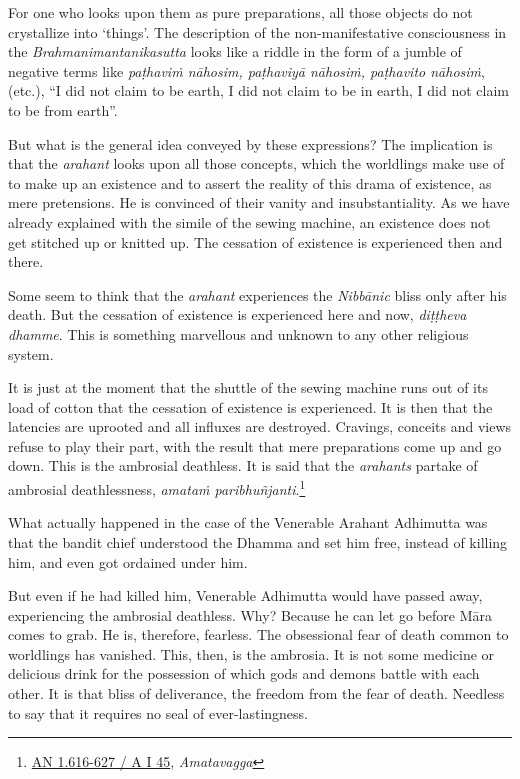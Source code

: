 For one who looks upon them as pure preparations, all those objects do not crystallize into `things'. The description of the non-manifestative consciousness in the \emph{Brahmanimantanikasutta} looks like a riddle in the form of a jumble of negative terms like \emph{paṭhaviṁ nāhosim, paṭhaviyā nāhosiṁ, paṭhavito nāhosiṁ}, (etc.), ``I did not claim to be earth, I did not claim to be in earth, I did not claim to be from earth''.

But what is the general idea conveyed by these expressions? The implication is that the \emph{arahant} looks upon all those concepts, which the worldlings make use of to make up an existence and to assert the reality of this drama of existence, as mere pretensions. He is convinced of their vanity and insubstantiality. As we have already explained with the simile of the sewing machine, an existence does not get stitched up or knitted up. The cessation of existence is experienced then and there.

Some seem to think that the \emph{arahant} experiences the \emph{Nibbānic} bliss only after his death. But the cessation of existence is experienced here and now, \emph{diṭṭheva dhamme}. This is something marvellous and unknown to any other religious system.

It is just at the moment that the shuttle of the sewing machine runs out of its load of cotton that the cessation of existence is experienced. It is then that the latencies are uprooted and all influxes are destroyed. Cravings, conceits and views refuse to play their part, with the result that mere preparations come up and go down. This is the ambrosial deathless. It is said that the \emph{arahants} partake of ambrosial deathlessness, \emph{amataṁ paribhuñjanti}.\footnote{\href{https://suttacentral.net/an1.616-627/pli/ms}{AN 1.616-627 / A I 45}, \emph{Amatavagga}}

What actually happened in the case of the Venerable Arahant Adhimutta was that the bandit chief understood the Dhamma and set him free, instead of killing him, and even got ordained under him.

But even if he had killed him, Venerable Adhimutta would have passed away, experiencing the ambrosial deathless. Why? Because he can let go before Māra comes to grab. He is, therefore, fearless. The obsessional fear of death common to worldlings has vanished. This, then, is the ambrosia. It is not some medicine or delicious drink for the possession of which gods and demons battle with each other. It is that bliss of deliverance, the freedom from the fear of death. Needless to say that it requires no seal of ever-lastingness.


